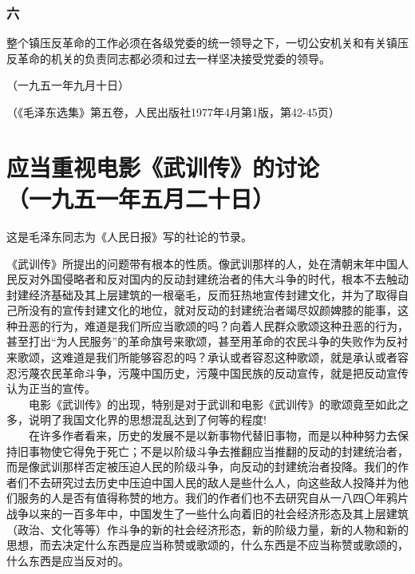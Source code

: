 \documentclass[cn,11pt,chinese]{elegantbook}
\def\myformat#1{\hfil\hfil #1}
\begin{document}
\subsubsection*{\myformat{六}}
整个镇压反革命的工作必须在各级党委的统一领导之下，一切公安机关和有关镇压反革命的机关的负责同志都必须和过去一样坚决接受党委的领导。\\
\begin{flushright}
（一九五一年九月十日）
\end{flushright}

\begin{flushright}（《毛泽东选集》第五卷，人民出版社1977年4月第1版，第42-45页）\end{flushright}
\newpage\section*{\myformat{应当重视电影《武训传》的讨论}\\\myformat{（一九五一年五月二十日）}}
\begin{introduction}\item  这是毛泽东同志为《人民日报》写的社论的节录。\end{introduction}
《武训传》所提出的问题带有根本的性质。像武训那样的人，处在清朝末年中国人民反对外国侵略者和反对国内的反动封建统治者的伟大斗争的时代，根本不去触动封建经济基础及其上层建筑的一根毫毛，反而狂热地宣传封建文化，并为了取得自己所没有的宣传封建文化的地位，就对反动的封建统治者竭尽奴颜婢膝的能事，这种丑恶的行为，难道是我们所应当歌颂的吗？向着人民群众歌颂这种丑恶的行为，甚至打出“为人民服务”的革命旗号来歌颂，甚至用革命的农民斗争的失败作为反衬来歌颂，这难道是我们所能够容忍的吗？承认或者容忍这种歌颂，就是承认或者容忍污蔑农民革命斗争，污蔑中国历史，污蔑中国民族的反动宣传，就是把反动宣传认为正当的宣传。\\
　　电影《武训传》的出现，特别是对于武训和电影《武训传》的歌颂竟至如此之多，说明了我国文化界的思想混乱达到了何等的程度!\\
　　在许多作者看来，历史的发展不是以新事物代替旧事物，而是以种种努力去保持旧事物使它得免于死亡；不是以阶级斗争去推翻应当推翻的反动的封建统治者，而是像武训那样否定被压迫人民的阶级斗争，向反动的封建统治者投降。我们的作者们不去研究过去历史中压迫中国人民的敌人是些什么人，向这些敌人投降并为他们服务的人是否有值得称赞的地方。我们的作者们也不去研究自从一八四〇年鸦片战争以来的一百多年中，中国发生了一些什么向着旧的社会经济形态及其上层建筑（政治、文化等等）作斗争的新的社会经济形态，新的阶级力量，新的人物和新的思想，而去决定什么东西是应当称赞或歌颂的，什么东西是不应当称赞或歌颂的，什么东西是应当反对的。\\
\end{document}
